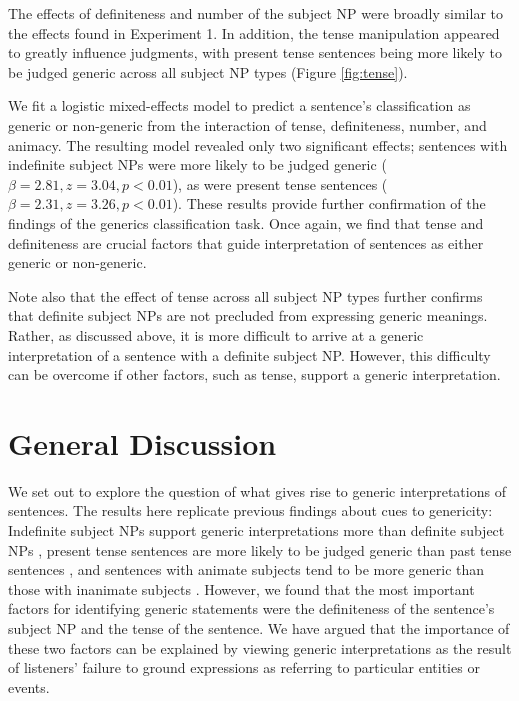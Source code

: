 \documentclass[10pt,letterpaper]{article}
\begin{document}
The effects of definiteness and number of the subject NP were broadly similar to the effects found in Experiment 1. In addition, the tense manipulation appeared to greatly influence judgments, with present tense sentences being more likely to be judged generic across all subject NP types (Figure \ref{fig:tense}).

We fit a logistic mixed-effects model to predict a sentence's classification as generic or non-generic from the interaction of tense, definiteness, number, and animacy. The resulting model revealed only two significant effects; sentences with indefinite subject NPs were more likely to be judged generic (\(\beta = 2.81, z = 3.04, p < 0.01\)), as were present tense sentences (\(\beta = 2.31, z = 3.26, p < 0.01\)). These results provide further confirmation of the findings of the generics classification task. Once again, we find that tense and definiteness are crucial factors that guide interpretation of sentences as either generic or non-generic. 

Note also that the effect of tense across all subject NP types further confirms that definite subject NPs are not precluded from expressing generic meanings. Rather, as discussed above, it is more difficult to arrive at a generic interpretation of a sentence with a definite subject NP. However, this difficulty can be overcome if other factors, such as tense, support a generic interpretation. 

\section{General Discussion}

We set out to explore the question of what gives rise to generic interpretations of sentences. The results here replicate previous findings about cues to genericity: Indefinite subject NPs support generic interpretations more than definite subject NPs \cite{Cimpian:2011, Gelman:2003}, present tense sentences are more likely to be judged generic than past tense sentences \cite{Cimpian:2011}, and sentences with animate subjects tend to be more generic than those with inanimate subjects \cite{Brandone:2009}. However, we found that the most important factors for identifying generic statements were the definiteness of the sentence's subject NP and the tense of the sentence. We have argued that the importance of these two factors can be explained by viewing generic interpretations as the result of listeners' failure to ground expressions as referring to particular entities or events.
\end{document}
